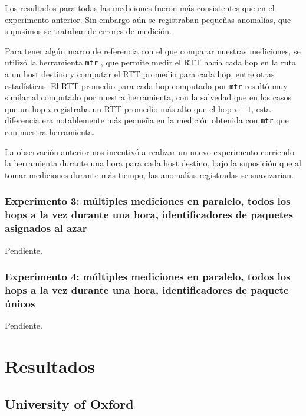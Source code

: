 \documentclass[a4paper, 10pt, twoside]{article}
\newcommand{\oxford}{University of Oxford}
\begin{document}
Los resultados para todas las mediciones fueron más consistentes que en el experimento anterior. Sin embargo aún se registraban pequeñas anomalías, que supusimos se trataban de errores de medición.

Para tener algún marco de referencia con el que comparar nuestras mediciones, se utilizó la herramienta \texttt{mtr} \cite{mtr}, que permite medir el RTT hacia cada hop en la ruta a un host destino y computar el RTT promedio para cada hop, entre otras estadísticas. El RTT promedio para cada hop computado por \texttt{mtr} resultó muy similar al computado por nuestra herramienta, con la salvedad que en los casos que un hop $i$ registraba un RTT promedio más alto que el hop $i + 1$, esta diferencia era notablemente más pequeña en la medición obtenida con \texttt{mtr} que con nuestra herramienta.

La observación anterior nos incentivó a realizar un nuevo experimento corriendo la herramienta durante una hora para cada host destino, bajo la suposición que al tomar mediciones durante más tiempo, las anomalías registradas se suavizarían.


\subsubsection{Experimento 3: múltiples mediciones en paralelo, todos los hops a la vez durante una hora, identificadores de paquetes asignados al azar}

Pendiente.


\subsubsection{Experimento 4: múltiples mediciones en paralelo, todos los hops a la vez durante una hora, identificadores de paquete únicos}

Pendiente.




\section{Resultados}
\label{sec:resultados}


\subsection{\oxford}
\end{document}
